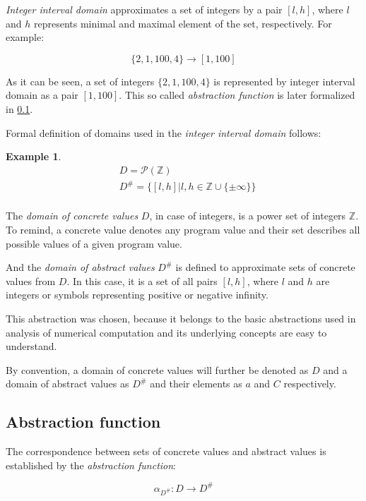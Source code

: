 \documentclass[12pt,oneside]{fithesis2}
\theoremstyle{definition}
\newtheorem{exmp}{Example}[section]
\begin{document}
\textit{Integer interval domain} approximates a set of integers by a pair $[l, h]$, where $l$ and $h$ represents minimal and maximal element of the set, respectively. For example:

\[
  \{ 2, 1, 100, 4 \} \to [1, 100]
\]

As it can be seen, a set of integers $\{2, 1, 100, 4\}$ is represented by integer interval domain as a pair $[1, 100]$. This so called \textit{abstraction function} is later formalized in \ref{ssec:abstraction-function}.

Formal definition of domains used in the \textit{integer interval domain} follows:

\begin{exmp}
  \begin{align*}
    &D = \mathcal P(\mathbb Z)\\
    &D^\# = \{[l,h] | l,h \in \mathbb{Z} \cup \{\pm\infty\}\}\\
  \end{align*}
\end{exmp}

The \textit{domain of concrete values} $D$, in case of integers, is a power set of integers $\mathbb Z$. To remind, a concrete value denotes any program value and their set describes all possible values of a given program value.

And the \textit{domain of abstract values} $D^\#$ is defined to approximate sets of concrete values from $D$. In this case, it is a set of all pairs $[l, h]$, where $l$ and $h$ are integers or symbols representing positive or negative infinity.

This abstraction was chosen, because it belongs to the basic abstractions used in analysis of numerical computation\cite{mine-AIAA10} and its underlying concepts are easy to understand.

By convention, a domain of concrete values will further be denoted as $D$ and a domain of abstract values as $D^\#$ and their elements as $a$ and $C$ respectively.

\subsection{Abstraction function}\label{ssec:abstraction-function}

The correspondence between sets of concrete values and abstract values is established by the \textit{abstraction function}: \cite{CousotCousot76-1}

\[
\alpha_{D^\#}\colon D \to D^\#
\]
\end{document}
